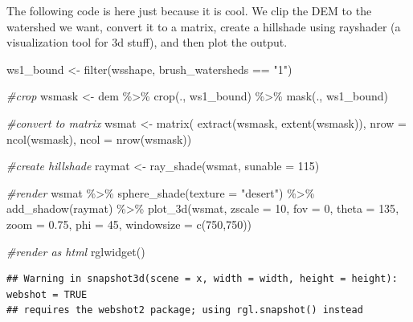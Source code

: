 \documentclass[
]{book}
\newenvironment{Shaded}{\begin{snugshade}}{\end{snugshade}}
\newcommand{\AttributeTok}[1]{\textcolor[rgb]{0.77,0.63,0.00}{#1}}
\newcommand{\CommentTok}[1]{\textcolor[rgb]{0.56,0.35,0.01}{\textit{#1}}}
\newcommand{\DecValTok}[1]{\textcolor[rgb]{0.00,0.00,0.81}{#1}}
\newcommand{\FloatTok}[1]{\textcolor[rgb]{0.00,0.00,0.81}{#1}}
\newcommand{\FunctionTok}[1]{\textcolor[rgb]{0.00,0.00,0.00}{#1}}
\newcommand{\NormalTok}[1]{#1}
\newcommand{\OtherTok}[1]{\textcolor[rgb]{0.56,0.35,0.01}{#1}}
\newcommand{\SpecialCharTok}[1]{\textcolor[rgb]{0.00,0.00,0.00}{#1}}
\newcommand{\StringTok}[1]{\textcolor[rgb]{0.31,0.60,0.02}{#1}}
\begin{document}
The following code is here just because it is cool. We clip the DEM to the watershed we want, convert it to a matrix, create a hillshade using rayshader (a visualization tool for 3d stuff), and then plot the output.

\begin{Shaded}
\begin{Highlighting}[]
\NormalTok{ws1\_bound }\OtherTok{\textless{}{-}} \FunctionTok{filter}\NormalTok{(wsshape, brush\_watersheds }\SpecialCharTok{==} \StringTok{"1"}\NormalTok{)}

\CommentTok{\#crop}
\NormalTok{wsmask }\OtherTok{\textless{}{-}}\NormalTok{ dem }\SpecialCharTok{\%\textgreater{}\%}
  \FunctionTok{crop}\NormalTok{(., ws1\_bound) }\SpecialCharTok{\%\textgreater{}\%}
  \FunctionTok{mask}\NormalTok{(., ws1\_bound)}

\CommentTok{\#convert to matrix}
\NormalTok{wsmat }\OtherTok{\textless{}{-}} \FunctionTok{matrix}\NormalTok{(}
  \FunctionTok{extract}\NormalTok{(wsmask, }\FunctionTok{extent}\NormalTok{(wsmask)),}
  \AttributeTok{nrow =} \FunctionTok{ncol}\NormalTok{(wsmask),}
  \AttributeTok{ncol =} \FunctionTok{nrow}\NormalTok{(wsmask))}

\CommentTok{\#create hillshade}
\NormalTok{raymat }\OtherTok{\textless{}{-}} \FunctionTok{ray\_shade}\NormalTok{(wsmat, }\AttributeTok{sunable =} \DecValTok{115}\NormalTok{)}

\CommentTok{\#render}
\NormalTok{wsmat }\SpecialCharTok{\%\textgreater{}\%}
  \FunctionTok{sphere\_shade}\NormalTok{(}\AttributeTok{texture =} \StringTok{"desert"}\NormalTok{) }\SpecialCharTok{\%\textgreater{}\%}
  \FunctionTok{add\_shadow}\NormalTok{(raymat) }\SpecialCharTok{\%\textgreater{}\%}
  \FunctionTok{plot\_3d}\NormalTok{(wsmat, }\AttributeTok{zscale =} \DecValTok{10}\NormalTok{, }\AttributeTok{fov =} \DecValTok{0}\NormalTok{, }\AttributeTok{theta =} \DecValTok{135}\NormalTok{, }\AttributeTok{zoom =} \FloatTok{0.75}\NormalTok{, }\AttributeTok{phi =} \DecValTok{45}\NormalTok{,}
          \AttributeTok{windowsize =} \FunctionTok{c}\NormalTok{(}\DecValTok{750}\NormalTok{,}\DecValTok{750}\NormalTok{))}

\CommentTok{\#render as html}
\FunctionTok{rglwidget}\NormalTok{()}
\end{Highlighting}
\end{Shaded}

\begin{verbatim}
## Warning in snapshot3d(scene = x, width = width, height = height): webshot = TRUE
## requires the webshot2 package; using rgl.snapshot() instead
\end{verbatim}
\end{document}
